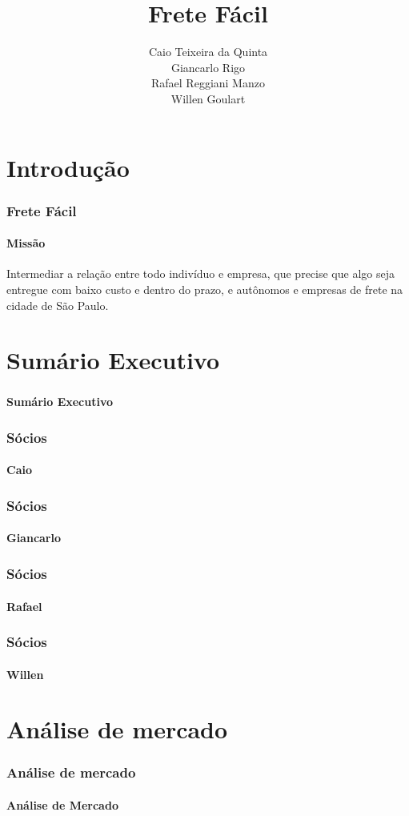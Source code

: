 \documentclass{beamer}
\title{Frete Fácil}
\author{Caio Teixeira da Quinta\\
        Giancarlo Rigo\\
        Rafael Reggiani Manzo\\
        Willen Goulart}
\begin{document}
\maketitle

\section{Introdução}
\begin{frame}
  \frametitle{Frete Fácil}
  \framesubtitle{Missão}
  
  Intermediar a relação entre todo indivíduo e empresa, que precise que algo seja entregue com baixo custo e dentro do prazo, e autônomos e empresas de frete na cidade de São Paulo.

\end{frame}

\section{Sumário Executivo}
\begin{frame}
  \frametitle{}
  \framesubtitle{}

  \begin{center}
    {\huge\textbf{Sumário Executivo}}
  \end{center}
\end{frame}

\begin{frame}
  \frametitle{Sócios}
  \framesubtitle{Caio}

\end{frame}

\begin{frame}
  \frametitle{Sócios}
  \framesubtitle{Giancarlo}

\end{frame}

\begin{frame}
  \frametitle{Sócios}
  \framesubtitle{Rafael}

\end{frame}

\begin{frame}
  \frametitle{Sócios}
  \framesubtitle{Willen}

\end{frame}

\section{Análise de mercado}

\begin{frame}
  \frametitle{Análise de mercado}
  \framesubtitle{}

  \begin{center}
    {\huge\textbf{Análise de Mercado}}

  \end{center}
\end{frame}
\end{document}
